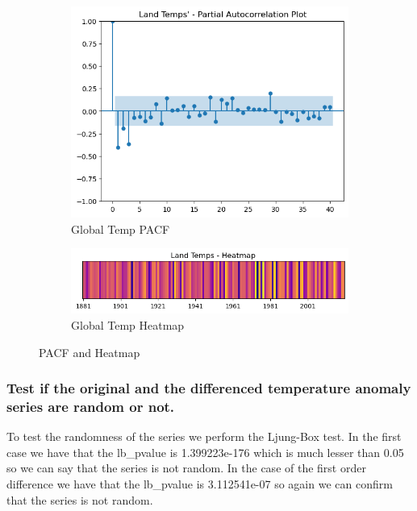 \documentclass{article}
\begin{document}
\begin{figure}[htbp]
  \centering
  \begin{subfigure}[b]{0.45\textwidth}
    \includegraphics[width=\textwidth]{img/global_temp_dt/pacf.png}
    \caption{Global Temp PACF}
    \label{fig:global_pacf}
  \end{subfigure}
  \hfill
  \begin{subfigure}[b]{0.45\textwidth}
    \includegraphics[width=\textwidth]{img/global_temp_dt/heatmap.png}
    \caption{Global Temp Heatmap}
    \label{fig:global_heatmap}
  \end{subfigure}
  \caption{PACF and Heatmap}
  \label{fig:global_temp4}
\end{figure}
 \subsubsection{Test if the original and the differenced temperature anomaly series are random or not.}
 To test the randomness of the series we perform the Ljung-Box test. In the first case we have that the lb\_pvalue is 1.399223e-176 which is much lesser than 0.05 so we can say that the series is not random. In the case of the first order difference we have that the lb\_pvalue is 3.112541e-07 so again we can confirm that the series is not random.
 
\end{document}
